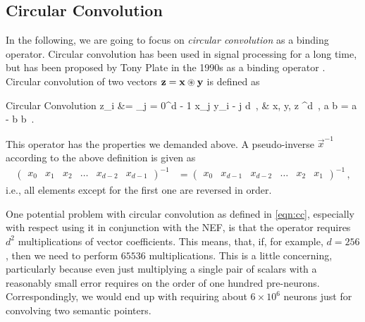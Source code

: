 \documentclass[10pt,letterpaper,oneside]{article}
\begin{document}

\subsection{Circular Convolution}

In the following, we are going to focus on \emph{circular convolution} as a binding operator. Circular convolution has been used in signal processing for a long time, but has been proposed by Tony Plate in the 1990s as a binding operator \cite{plate1995holographic}. Circular convolution of two vectors ${\mathbf{z}} = {\mathbf{x}} \circledast {\mathbf{y}}$ is defined as
\begin{ImportantEqn}{Circular Convolution}
	z_i &= \sum_{j = 0}^{d - 1} x_{j} y_{i - j \hspace{-1.25mm} \mod d } \,, &  \vec x, \vec y, \vec z \in {}^d \,,  a \hspace{-2mm} \mod b = a - b \left\lfloor {}b \right\rfloor \,.
	\label{eqn:cc}
\end{ImportantEqn}
This operator has the properties we demanded above. A pseudo-inverse $\vec x^{-1}$ according to the above definition is given as
\begin{align*}
 	\begin{pmatrix} x_0 & x_1 & x_2 & \hdots & x_{d - 2} & x_{d - 1} \end{pmatrix}^{-1} &= \begin{pmatrix} x_0 & x_{d-1} & x_{d-2} & \hdots & x_2 & x_1 \end{pmatrix}^{-1} \,,
\end{align*}
i.e., all elements except for the first one are reversed in order.


One potential problem with circular convolution as defined in \cref{eqn:cc}, especially with respect using it in conjunction with the NEF, is that the operator requires $d^2$ multiplications of vector coefficients. This means, that, if, for example, $d = 256$, then we need to perform $65536$ multiplications. This is a little concerning, particularly because even just multiplying a single pair of scalars with a reasonably small error requires on the order of one hundred pre-neurons. Correspondingly, we would end up with requiring about $6\times10^6$ neurons just for convolving two semantic pointers.
\end{document}
